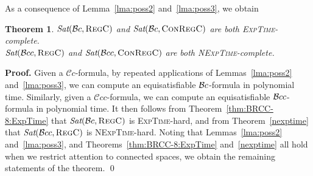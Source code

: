 \documentclass{LMCS}
\renewenvironment{proof}{\par\noindent\textbf{Proof.}}{\mbox{}\qed\par\medskip}
\theoremstyle{plain}
\newtheorem{theorem}[thm]{Theorem}
\newcommand{\cBC}{\ensuremath{\mathcal{C}}}
\newcommand{\cBCc}{\ensuremath{\cBC{}c}} \newcommand{\cBCcc}{\ensuremath{\cBC{}cc}}
\newcommand{\Sat}{\textit{Sat}}
\newcommand{\Regc}{\textsc{RegC}}
\newcommand{\ConR}{\textsc{ConRegC}}
\newcommand{\ExpTime}{\textsc{ExpTime}}
\newcommand{\NExpTime}{\textsc{NExpTime}}
\begin{document}
As a consequence of Lemma~\ref{lma:poss2} and~\ref{lma:poss3}, we obtain
\begin{theorem}\label{thm:Bc:ExpTime}
$\Sat(\cBc,\Regc)$ and $\Sat(\cBc,\ConR)$ are both
\ExpTime{}-complete.\\ $\Sat(\cBcc,\Regc)$ and $\Sat(\cBcc,\ConR)$ are both
\NExpTime{}-complete.
\end{theorem}
\begin{proof}
Given a $\cBCc$-formula, by repeated applications of Lemmas~\ref{lma:poss2} and~\ref{lma:poss3}, we can compute an
equisatisfiable $\mathcal{B}c$-formula in polynomial time.  Similarly, given
a $\cBCcc$-formula, we can compute an equisatisfiable
$\mathcal{B}cc$-formula in polynomial time.  It then follows from
Theorem~\ref{thm:BRCC-8:ExpTime} that $\Sat(\cBc,\Regc)$ is
\ExpTime{}-hard, and from Theorem~\ref{nexptime} that
$\Sat(\cBcc,\Regc)$ is \NExpTime{}-hard.
Noting that Lemmas~\ref{lma:poss2} and~\ref{lma:poss3}, and
Theorems~\ref{thm:BRCC-8:ExpTime} and~\ref{nexptime} all
hold when we restrict attention to connected spaces, we obtain the
remaining statements of the theorem.
\end{proof}
\end{document}
